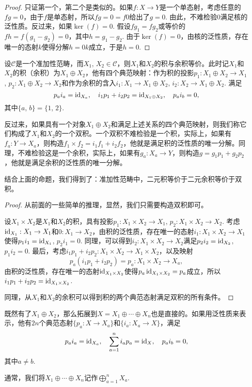 \begin{proof}
只证第一个，第二个是类似的。如果$f:X\to Y$是一个单态射，考虑任意的$fg=0$，由于$f$是单态射，所以$fg=0=f0$给出了$g=0$. 由此，不难检验$0$满足核的泛性质。反过来，如果$\ker(f)=0$. 假设$fg_1=fg_2$或等价的$fh=f(g_1-g_2)=0$，其中$h=g_1-g_2$. 由于$\ker(f)=0$，由核的泛性质，存在唯一的态射$k$使得分解$h=0k$成立，于是$h=0$.
\end{proof}

\begin{pro}
设$\mathcal{C}$是一个准加性范畴，而$X_1$, $X_2\in \mathcal{C}$，则$X_1$和$X_2$的积与余积等价。此时记$X_1$和$X_2$的积（余积）为$X_1\oplus X_2$，他有四个典范映射：作为积的投影$p_1:X_1\oplus X_2\to X_1$, $p_2:X_1\oplus X_2\to X_2$和作为余积的含入$i_1:X_1\to X_1\oplus X_2$, $i_2:X_2\to X_1\oplus X_2$. 满足
\[
	p_ai_a=\operatorname{id}_{X_a},\quad i_1p_1+i_2p_2=\operatorname{id}_{X_1\oplus X_2},\quad p_ai_b=0,
\]
其中$\{a$, $b\}=\{1$, $2\}$. 
\end{pro}

反过来，如果具有一个对象$X_1\oplus X_2$和满足上述关系的四个典范映射，则我们称它们构成了$X_1$和$X_2$的一个双积。一个双积不难检验是一个积，实际上，如果有$f_a:Y\to X_a$，则构造$f_1\times f_2=i_1f_1+i_2f_2$，他就是满足积的泛性质的唯一分解。同理，不难检验这是一个余积，实际上，如果有$g_a:X_a\to Y$，则构造$g=g_1p_1+g_2p_2$，他就是满足余积的泛性质的唯一分解。

结合上面的命题，我们得到了：准加性范畴中，二元积等价于二元余积等价于双积。

\begin{proof}
从前面的一些简单的推理，显然，我们只需要构造双积即可。

设$X_1\times X_2$是$X_1$和$X_2$的积，具有投影$p_1:X_1\times X_2\to X_1$, $p_2:X_1\times X_2\to X_2$. 考虑$\operatorname{id}_{X_1}:X_1\to X_1$和$0:X_1\to X_2$，由积的泛性质，存在唯一的态射$i_1:X_1\times X_2 \to X_1$使得$p_1i_1=\operatorname{id}_{X_1}$, $p_2i_1=0$. 同理，可以得到$i_2:X_1\times X_2 \to X_2$满足$p_2i_2=\operatorname{id}_{X_2}$, $p_1i_2=0$. 最后，考虑$i_1p_1+i_2p_2:X_1\times X_2\to X_1\times X_2$，以及映射
\[
	p_a(i_1p_1+i_2p_2)=p_a:X_1\times X_2\to X_a,
\]
由积的泛性质，存在唯一的态射$\operatorname{id}_{X_1\times X_2}$使得$p_a\operatorname{id}_{X_1\times X_2}=p_a$成立，所以$i_1p_1+i_2p_2=\operatorname{id}_{X_1\times X_2}$.

同理，从$X_1$和$X_2$的余积可以得到积的两个典范态射满足双积的所有条件。
\end{proof}

\begin{para}
既然有了$X_1\oplus X_2$，那么拓展到$X=X_1\oplus \cdots \oplus X_n$也是直接的。如果用泛性质来表示，他有$2n$个典范态射$\{p_a:X\to X_a\}$和$\{i_a:X_a\to X\}$，满足
\[
	p_ai_a=\operatorname{id}_{X_a},\quad \sum_{a=1}^n i_ap_a=\operatorname{id}_{X},\quad p_ai_b=0,
\]
其中$a\neq b$.

通常，我们将$X_1\oplus \cdots \oplus X_n$记作$\bigoplus_{a=1}^nX_a$.
\end{para}


